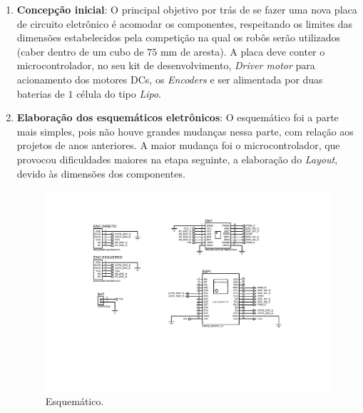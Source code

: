 \begin{enumerate}
    \item \textbf{Concepção inicial}:
        O principal objetivo por trás de se fazer uma nova placa de circuito eletrônico é acomodar os componentes, respeitando os limites das dimensões estabelecidos pela competição na qual os robôs serão utilizados (caber dentro de um cubo de $75$ mm de aresta). A placa deve conter o microcontrolador, no seu kit de desenvolvimento, \textit{Driver motor} para acionamento dos motores DCs, os \textit{Encoders} e ser alimentada por duas baterias de $1$ célula do tipo \textit{Lipo}.
        
    \item \textbf{Elaboração dos esquemáticos eletrônicos}:
        O esquemático foi a parte mais simples, pois não houve grandes mudanças nessa parte, com relação aos projetos de anos anteriores. A maior mudança foi o microcontrolador, que provocou dificuldades maiores na etapa seguinte, a elaboração do \textit{Layout}, devido às dimensões dos componentes.
        
        
        \begin{figure}[H]
            \centering
            \includegraphics[width=\textwidth]{figuras/eletronica/placa/esquematico_completo.pdf}
            \caption{Esquemático.}
        \end{figure}
        

\end{enumerate}
